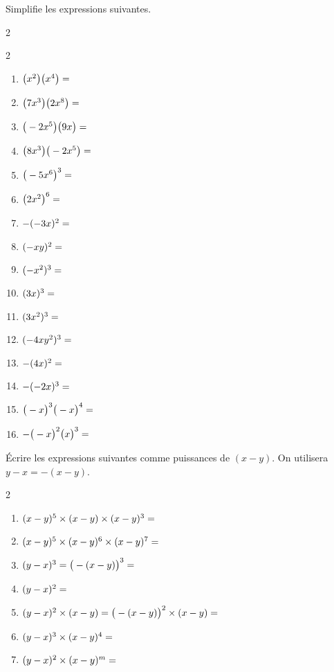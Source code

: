 \documentclass[main.tex]{subfiles}
\begin{document}
\begin{exercise} Simplifie les expressions suivantes.\hfill \vspace{-0.75em}
	\begin{multicols}{2}
		\begin{spacing}{2} 
			\begin{enumerate}[label={}, leftmargin=*]   
				\item $\big(x^2\big)\big(x^4\big)=\dotfill$
				\item $\big(7x^3\big)\big(2x^8\big)=\dotfill$
				\item $\big(-2x^5\big)\big(9x\big)=\dotfill$
				\item $\big(8x^3\big)\big(-2x^5\big)=\dotfill$ 
				\item $\big(-5x^6\big)^3 =\dotfill$
				\item $\big(2x^2\big)^6 =\dotfill $
				\item  $-(-3x)^2=\dotfill $
				\item  $(-xy)^2=\dotfill $
				\item  $(-x^2)^3=\dotfill $
				\item  $(3x)^3=\dotfill $
				\item  $(3x^2)^3=\dotfill $
				\item  $(-4xy^2)^3=\dotfill $
				\item  $-(4x)^2=\dotfill $
				\item  $-(-2x)^3=\dotfill $
				\item $\big(-x\big)^3\big(-x\big)^4=\dotfill$ 
				\item $-\big(-x\big)^2\big(x\big)^3=\dotfill$ 
			\end{enumerate}
		\end{spacing}%
	\end{multicols}  
\end{exercise} 
\begin{exercise} Écrire les expressions suivantes comme puissances de $(x-y)$. On utilisera $y-x=-(x-y)$.\hfill \vspace{-0.75em}
		\begin{spacing}{2} 
			\begin{enumerate}[label={}, leftmargin=*]   
				\item $(x-y)^5\times (x-y)\times (x-y)^3=\dotfill $
				\item $(x-y)^5\times (x-y)^6\times (x-y)^7=\dotfill$ 
				\item $(y-x)^3=\big( -(x-y)\big)^3=\dotfill $
				\item $(y-x)^2= \dotfill $
				\item $(y-x)^2\times (x-y)=\big( -(x-y)\big)^2\times (x-y)=\dotfill $
				\item $(y-x)^3\times (x-y)^4=\dotfill $
				\item $(y-x)^2\times (x-y)^m=\dotfill $
			\end{enumerate}
		\end{spacing}%
\end{exercise} 
	 
\end{document}
